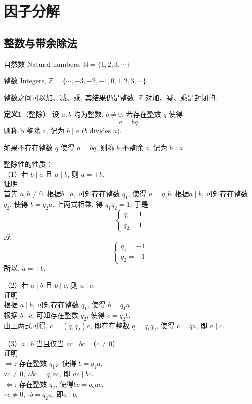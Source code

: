 \section{因子分解}
\subsection{整数与带余除法}

自然数 Natural numbers, 
$ \mathbb{N} = \{ 1, 2, 3, \cdots \} $

整数 Integers, 
$ \mathbb{Z} = \{ \cdots, -3, -2, -1, 0, 1, 2, 3, \cdots \} $

整数之间可以加、减、乘, 其结果仍是整数. $ \mathbb{Z} $ 对加、减、乘是封闭的. 

\textbf{定义1}（整除） 设 $a, b$ 均为整数, $ b \neq 0 $. 若存在整数 $ q $ 使得
\[ 
    a = bq,
\]
则称 b 整除 a, 记为 $ b \mid a $ ($b$ divides $a$). 

如果不存在整数 $q$ 使得 $a=bq$, 则称 $b$ 不整除 $a$, 记为 $b \nmid a$. 

整除性的性质：\\
（1）若 $ b \mid a $ 且 $ a \mid b$, 则 $a = \pm b$.\\
证明\\
首先 $a,b\neq 0$.
根据$ b \mid a $, 可知存在整数 $q_1$, 使得 $a=q_1 b$. 
根据$ a \mid b$, 可知存在整数 $q_2$, 使得 $b=q_2 a$. 
上两式相乘, 得 $q_1 q_2 = 1$, 于是\\
\[
    \left\{ 
        \begin{array}{lc}
            q_1 = 1\\
            q_2 = 1
        \end{array}
    \right.
\]
或
\[
    \left\{ 
        \begin{array}{lc}
            q_1 = -1\\
            q_2 = -1
        \end{array}
    \right.
\]
所以, $a = \pm b$.

（2）若 $ a \mid b $ 且 $ b \mid c $, 则 $a \mid c$.\\
证明\\
根据 $a\mid b$, 可知存在整数 $q_1$, 使得 $b=q_1 a$.\\
根据 $b\mid c$, 可知存在整数 $q_2$, 使得 $c=q_2 b$.\\
由上两式可得, $c=(q_1q_2)a$, 即存在整数 $q=q_1q_2$, 使得 $c=qa$, 即 $a \mid c$.

（3）$a\mid b$ 当且仅当 $ac\mid bc$. （$c\neq 0$）\\
证明\\
$\Rightarrow$: 存在整数 $q_1$，使得 $b=q_1a$.\\
$\because c\neq 0$, $\therefore bc=q_1ac$, 即 $ac\mid bc$.\\
$\Leftarrow$: 存在整数  $q_2$, 使得$bc=q_2ac$.\\
$\because c\neq 0, \therefore b=q_2a$, 即$a\mid b$.

